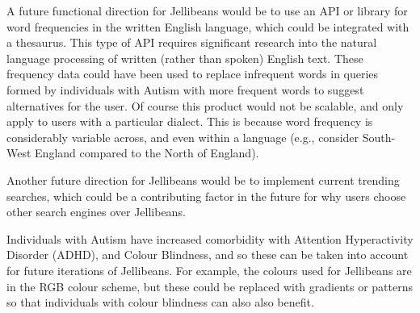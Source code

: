 \documentclass[a4paper, 11pt]{article}
\begin{document}
\vspace{5mm}
A future functional direction for Jellibeans would be to use an API or library for word frequencies in the written English language, which could be integrated with a thesaurus. This type of API requires significant research into the natural language processing of written (rather than spoken) English text. These frequency data could have been used to replace infrequent words in queries formed by individuals with Autism with more frequent words to suggest alternatives for the user. Of course this product would not be scalable, and only apply to users with a particular dialect. This is because word frequency is considerably variable across, and even within a language (e.g., consider South-West England compared to the North of England).

\vspace{5mm}
Another future direction for Jellibeans would be to implement current trending searches, which could be a contributing factor in the future for why users choose other search engines over Jellibeans. 

\vspace{5mm}
Individuals with Autism have increased comorbidity with Attention Hyperactivity Disorder (ADHD), and Colour Blindness, and so these can be taken into account for future iterations of Jellibeans. For example, the colours used for Jellibeans are in the RGB colour scheme, but these could be replaced with gradients or patterns so that individuals with colour blindness can also also benefit.
\end{document}
